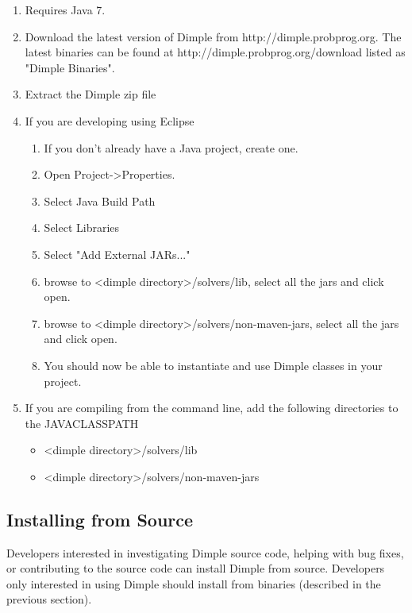 \fi

\ifjava

\begin{enumerate}
\item Requires Java 7.
\item Download the latest version of Dimple from http://dimple.probprog.org.  The latest binaries can be found at http://dimple.probprog.org/download listed as "Dimple Binaries".
\item Extract the Dimple  zip file
\item If you are developing using Eclipse
\begin{enumerate}
\item If you don't already have a Java project, create one.
\item Open Project-\textgreater Properties.
\item Select Java Build Path
\item Select Libraries
\item Select "Add External JARs..."
\item browse to \textless dimple directory\textgreater /solvers/lib, select all the jars and click open.
\item browse to \textless dimple directory\textgreater /solvers/non-maven-jars, select all the jars and click open.
\item You should now be able to instantiate and use Dimple classes in your project.
\end{enumerate}
\item If you are compiling from the command line, add the following directories to the JAVACLASSPATH
\begin{itemize}
\item \textless dimple directory\textgreater /solvers/lib
\item \textless dimple directory\textgreater /solvers/non-maven-jars
\end{itemize}
\end{enumerate}

\fi

\subsection{Installing from Source}

Developers interested in investigating Dimple source code, helping with bug fixes, or contributing to the source code can install Dimple from source.  Developers only interested in using Dimple should install from binaries (described in the previous section).


